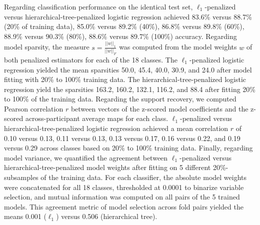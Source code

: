 \documentclass[runningheads,a4paper]{llncs}
\begin{document}
%
Regarding classification performance on the identical test set,
$\ell_1$-penalized versus hierarchical-tree-penalized logistic regression
achieved
83.6\% versus 88.7\% (20\% of training data),
85.0\% versus 89.2\% (40\%),
86.8\% versus 89.8\% (60\%),
88.9\% versus 90.3\% (80\%),
88.6\% versus 89.7\% (100\%) accuracy.
%
Regarding model sparsity,
the measure $s = \frac{||w||_1}{||w||_F}$ was computed from
the model weights $w$ of both penalized estimators
for each of the 18 classes.
The $\ell_1$-penalized logistic regression
yielded the mean sparsities
50.0, 45.4, 40.0, 30.9, and 24.0
after model fitting with 20\% to 100\% training data.
The hierarchical-tree-penalized logistic regression
yield the sparsities
163.2, 160.2, 132.1, 116.2, and 88.4
after fitting 20\% to 100\% of the training data.
Regarding the support recovery, we computed
Pearson correlation $r$ between vectors of
the z-scored model coefficients
and
the z-scored across-participant average maps for each class.
$\ell_1$-penalized versus hierarchical-tree-penalized logistic regression
achieved a mean correlation $r$ of
0.10 versus 0.13,
0.11 versus 0.13,
0.13 versus 0.17,
0.16 versus 0.22, and
0.19 versus 0.29 across classes
based on 20\% to 100\% training data.
Finally, regarding model variance,
we quantified the agreement between
$\ell_1$-penalized versus hierarchical-tree-penalized
model weights after fitting
on 5 different 20\%-subsamples of the training data.
For each classifier,
the absolute model weights were concatenated for all 18 classes,
thresholded at 0.0001 to binarize variable selection,
and mutual information was computed on all pairs
of the 5 trained models.
This agreement metric of model selection across fold pairs
yielded the means 0.001 ($\ell_1$) versus 0.506 (hierarchical tree).
\end{document}
